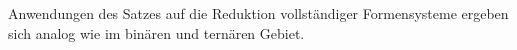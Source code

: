 Anwendungen des Satzes auf die Reduktion vollst\"andiger Formensysteme ergeben sich analog wie im bin\"aren und tern\"aren Gebiet.

